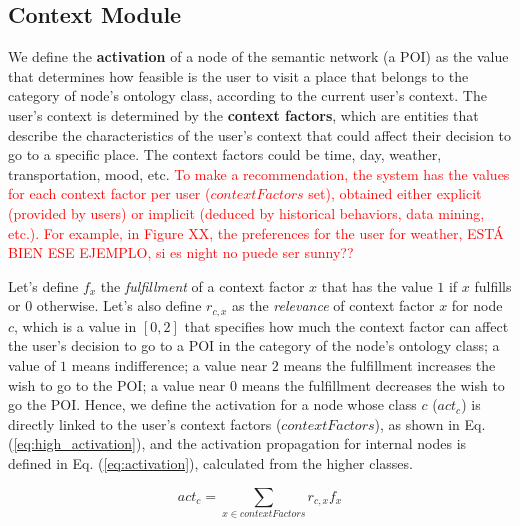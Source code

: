 \subsection{Context Module}
We define the \textbf{activation} of a node of the semantic network (a POI) as the value that determines how feasible 
is the user to visit a place that belongs to the category of  node's ontology class, according to the current user's context.
The user's context is determined by the \textbf{context factors}, which are entities that describe the characteristics of the user’s context that could affect their decision to go to a specific place. The context factors could be time, day, weather, transportation, mood, etc. \textcolor{red}{To make a recommendation, the system has the
values for each context factor per user ($contextFactors$ set), obtained either explicit (provided by users) or implicit (deduced by historical behaviors, data mining, etc.).  For example, in Figure XX, the preferences for the user for weather, ESTÁ BIEN ESE EJEMPLO, si es night no puede ser sunny?? } 

Let's define $f_x$ the \textit{fulfillment} of a context factor $x$ that has the value $1$ if $x$ fulfills or $0$ otherwise. Let's also define $r_{c,x}$ as the \textit{relevance} of context factor $x$ for node $c$, which is a 
value in $[0, 2]$ that specifies how much the context factor can affect the user's decision to go to a POI in the category of 
the node's ontology class; 
a value of $1$ means indifference; a value near $2$ means the fulfillment increases the wish to go to the POI; a value near $0$ means the fulfillment decreases the wish to go the POI. Hence, we define the activation for a node whose class $c$ ($act_c$) is directly linked to the user's context factors ($contextFactors$), as shown in Eq. (\ref{eq:high_activation}), and the activation propagation for internal nodes is defined in Eq. (\ref{eq:activation}), calculated from the higher classes.


\begin{equation} \label{eq:high_activation}
    act_c = \sum_{x \in contextFactors} r_{c,x} f_x
\end{equation}


